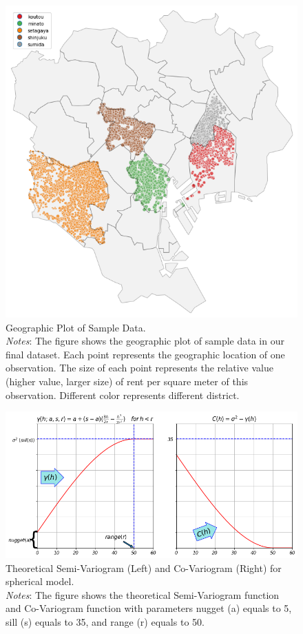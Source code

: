 \documentclass[a4paper, 12pt]{article} %
\begin{document}
\begin{figure}
\centering
\includegraphics[scale=0.75]{sampledata.png}
\caption{Geographic Plot of Sample Data.\\
\textit{Notes}: The figure shows the geographic plot of sample data in our final dataset. Each point represents the geographic location of one observation. The size of each point represents the relative value (higher value, larger size) of rent per square meter of this observation. Different color represents different district.}
\label{fig1}
\end{figure}

\begin{figure}
\centering
\includegraphics[scale=0.5]{variogram.png}
\caption{Theoretical Semi-Variogram (Left) and Co-Variogram (Right) for spherical model. \\
\textit{Notes}: The figure shows the theoretical Semi-Variogram function and Co-Variogram function with parameters nugget (a) equals to 5, sill (s) equals to 35, and range (r) equals to 50. }
\label{fig2}
\end{figure}
\end{document}
